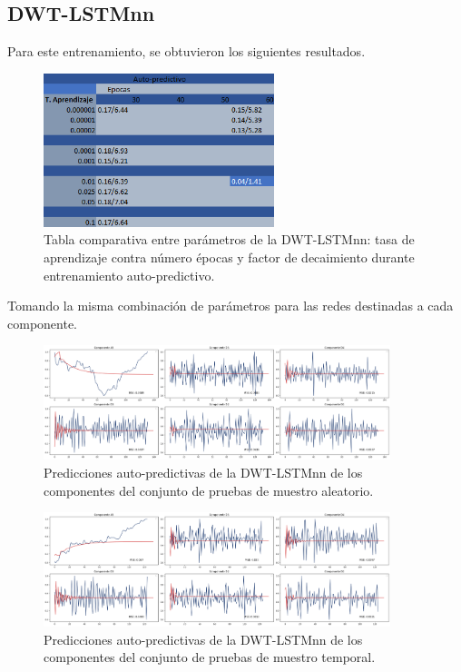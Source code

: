 \newpage

\subsection{DWT-LSTMnn}

Para este entrenamiento, se obtuvieron los siguientes resultados. 

\begin{figure}[H]
    \centering
    \includegraphics[width=0.6\textwidth]{Figuras/proceso_de_entrenamiento/lr_epocas_DWT_LSTM_auto_pred.png}
    \caption{Tabla comparativa entre parámetros de la DWT-LSTMnn: tasa de aprendizaje contra número épocas y factor de decaimiento durante entrenamiento auto-predictivo.} 
    \label{fig:lr_epocas_DWTLSTM_autopred_v2}
\end{figure}

Tomando la misma combinación de parámetros para las redes destinadas a cada componente.

\begin{figure}[H]
    \centering
    \includegraphics[width=0.9\textwidth]{Figuras/proceso_de_entrenamiento/grafs_c_prueba/muestreo_aleatorio/DWT_LSTM/auto_predictiva/DWT_LSTM.png}
    \caption{Predicciones auto-predictivas de la DWT-LSTMnn de los componentes del conjunto de pruebas de muestro aleatorio.} 
    \label{fig:c_prueba_componentes_DWTLSTM_autopred_aleatorio}
\end{figure}

\begin{figure}[H]
    \centering
    \includegraphics[width=0.9\textwidth]{Figuras/proceso_de_entrenamiento/grafs_c_prueba/DWT_LSTM/auto_predictiva/DWT_LSTM.png}
    \caption{Predicciones auto-predictivas de la DWT-LSTMnn de los componentes del conjunto de pruebas de muestro temporal.} 
    \label{fig:c_prueba_componentes_DWTLSTM_autopred}
\end{figure}

